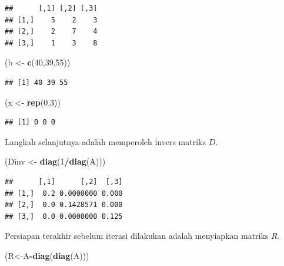 \documentclass[]{book}
\newenvironment{Shaded}{\begin{snugshade}}{\end{snugshade}}
\newcommand{\DecValTok}[1]{\textcolor[rgb]{0.00,0.00,0.81}{#1}}
\newcommand{\KeywordTok}[1]{\textcolor[rgb]{0.13,0.29,0.53}{\textbf{#1}}}
\newcommand{\NormalTok}[1]{#1}
\newcommand{\OperatorTok}[1]{\textcolor[rgb]{0.81,0.36,0.00}{\textbf{#1}}}
\newcommand{\StringTok}[1]{\textcolor[rgb]{0.31,0.60,0.02}{#1}}
\theoremstyle{definition}
\theoremstyle{definition}
\theoremstyle{definition}
\theoremstyle{remark}
\begin{document}
\begin{verbatim}
##      [,1] [,2] [,3]
## [1,]    5    2    3
## [2,]    2    7    4
## [3,]    1    3    8
\end{verbatim}

\begin{Shaded}
\begin{Highlighting}[]
\NormalTok{(b <-}\StringTok{ }\KeywordTok{c}\NormalTok{(}\DecValTok{40}\NormalTok{,}\DecValTok{39}\NormalTok{,}\DecValTok{55}\NormalTok{))}
\end{Highlighting}
\end{Shaded}

\begin{verbatim}
## [1] 40 39 55
\end{verbatim}

\begin{Shaded}
\begin{Highlighting}[]
\NormalTok{(x <-}\StringTok{ }\KeywordTok{rep}\NormalTok{(}\DecValTok{0}\NormalTok{,}\DecValTok{3}\NormalTok{))}
\end{Highlighting}
\end{Shaded}

\begin{verbatim}
## [1] 0 0 0
\end{verbatim}

Langkah selanjutnya adalah memperoleh invers matriks \(D\).

\begin{Shaded}
\begin{Highlighting}[]
\NormalTok{(Dinv <-}\StringTok{ }\KeywordTok{diag}\NormalTok{(}\DecValTok{1}\OperatorTok{/}\KeywordTok{diag}\NormalTok{(A)))}
\end{Highlighting}
\end{Shaded}

\begin{verbatim}
##      [,1]      [,2]  [,3]
## [1,]  0.2 0.0000000 0.000
## [2,]  0.0 0.1428571 0.000
## [3,]  0.0 0.0000000 0.125
\end{verbatim}

Persiapan terakhir sebelum iterasi dilakukan adalah menyiapkan matriks \(R\).

\begin{Shaded}
\begin{Highlighting}[]
\NormalTok{(R<-A}\OperatorTok{-}\KeywordTok{diag}\NormalTok{(}\KeywordTok{diag}\NormalTok{(A)))}
\end{Highlighting}
\end{Shaded}
\end{document}
